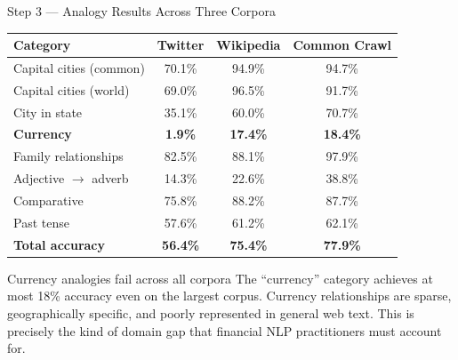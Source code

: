 \documentclass[11pt,aspectratio=169,professionalfonts]{beamer}
\begin{document}
\begin{frame}{Step 3 — Analogy Results Across Three Corpora}
\small
\begin{center}
\begin{tabular}{lccc}
\toprule
\textbf{Category} & \textbf{Twitter} & \textbf{Wikipedia} & \textbf{Common Crawl} \\
\midrule
Capital cities (common)  & 70.1\% & 94.9\% & 94.7\% \\
Capital cities (world)   & 69.0\% & 96.5\% & 91.7\% \\
City in state            & 35.1\% & 60.0\% & 70.7\% \\
\textbf{Currency}        & \textbf{1.9\%}  & \textbf{17.4\%} & \textbf{18.4\%} \\
Family relationships     & 82.5\% & 88.1\% & 97.9\% \\
Adjective $\to$ adverb   & 14.3\% & 22.6\% & 38.8\% \\
Comparative              & 75.8\% & 88.2\% & 87.7\% \\
Past tense               & 57.6\% & 61.2\% & 62.1\% \\
\midrule
\textbf{Total accuracy}  & \textbf{56.4\%} & \textbf{75.4\%} & \textbf{77.9\%} \\
\bottomrule
\end{tabular}
\end{center}
\footnotesize
\begin{alertblock}{Currency analogies fail across all corpora}
  The ``currency'' category achieves at most 18\% accuracy even on the
  largest corpus. Currency relationships are sparse, geographically
  specific, and poorly represented in general web text. This is precisely
  the kind of domain gap that financial NLP practitioners must account for.
\end{alertblock}

\end{frame}
%
%
\end{document}
